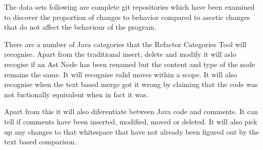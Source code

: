 The data sets following are complete git repositories which have been examined to discover the proportion of changes to behavior compared to ascetic changes that do not affect the behaviour of the program. 

% 
% 




There are a number of Java categories that the Refactor Categories Tool will recognise.  Apart from the traditional insert, delete and modify it will aslo recogise if an Ast Node has been renamed but the content and type of the node remains the same.  It will recognise valid moves within a scope. It will also recognise when the text based merge got it wrong by claiming that the code was not fuctionally equivalent when in fact it was.

Apart from this it will also diferentiate between Java code and comments.  It can tell if comments have been inserted, modified, moved or deleted.  It will also pick up any changes to that whitespace that have not already been figured out by the text based comparison.  

 
% 


% 
% 
% 
% 
% 
% 



